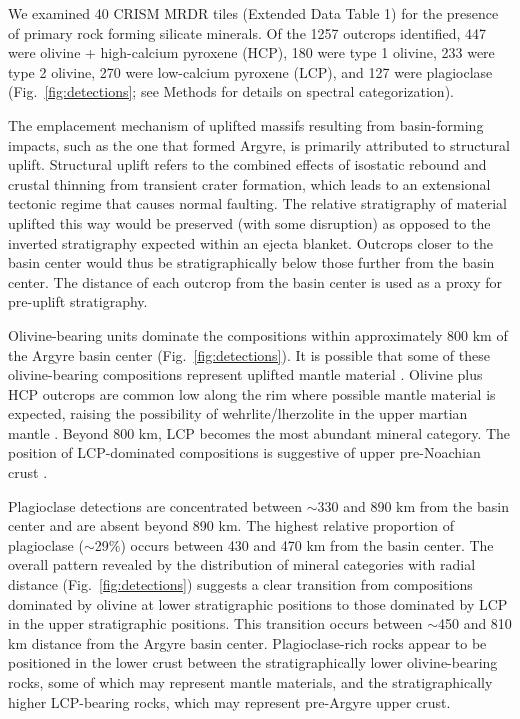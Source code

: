 \documentclass[12pt]{article}
\begin{document}
We examined 40 CRISM MRDR tiles (Extended Data Table 1) for the presence of primary rock forming silicate minerals. Of the 1257 outcrops identified, 447 were olivine + high-calcium pyroxene (HCP), 180 were type 1 olivine, 233 were type 2 olivine, 270 were low-calcium pyroxene (LCP), and 127 were plagioclase (Fig.~\ref{fig:detections}; see Methods for details on spectral categorization).

The emplacement mechanism of uplifted massifs resulting from basin-forming impacts, such as the one that formed Argyre, is primarily attributed to structural uplift. Structural uplift refers to the combined effects of isostatic rebound and crustal thinning from transient crater formation, which leads to an extensional tectonic regime that causes normal faulting. The relative stratigraphy of material uplifted this way would be preserved (with some disruption) as opposed to the inverted stratigraphy expected within an ejecta blanket. Outcrops closer to the basin center would thus be stratigraphically below those further from the basin center. The distance of each outcrop from the basin center is used as a proxy for pre-uplift stratigraphy.

Olivine-bearing units dominate the compositions within approximately 800 km of the Argyre basin center (Fig.~\ref{fig:detections}). It is possible that some of these olivine-bearing compositions represent uplifted mantle material \citep{Koeppen2008, Ody2013}. Olivine plus HCP outcrops are common low along the rim where possible mantle material is expected, raising the possibility of wehrlite/lherzolite in the upper martian mantle \citep{McGetchin1978, Treiman2025, Bernadet2025}. Beyond 800 km, LCP becomes the most abundant mineral category. The position of LCP-dominated compositions is suggestive of upper pre-Noachian crust \citep{Buczkowski2010, McNeil2025}.

Plagioclase detections are concentrated between $\sim$330 and 890 km from the basin center and are absent beyond 890 km. The highest relative proportion of plagioclase ($\sim$29\%) occurs between 430 and 470 km from the basin center. The overall pattern revealed by the distribution of mineral categories with radial distance (Fig.~\ref{fig:detections}) suggests a clear transition from compositions dominated by olivine at lower stratigraphic positions to those dominated by LCP in the upper stratigraphic positions. This transition occurs between $\sim$450 and 810 km distance from the Argyre basin center. Plagioclase-rich rocks appear to be positioned in the lower crust between the stratigraphically lower olivine-bearing rocks, some of which may represent mantle materials, and the stratigraphically higher LCP-bearing rocks, which may represent pre-Argyre upper crust.
\end{document}

